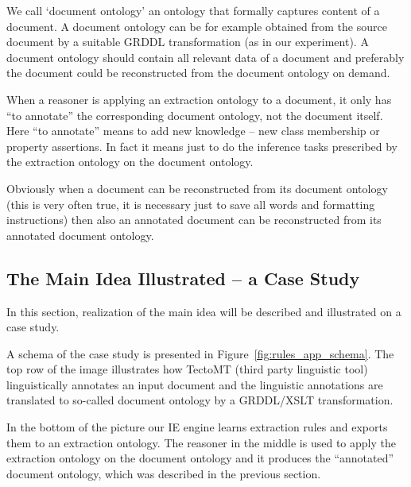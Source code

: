 We call `document ontology' an ontology that formally captures content of a document. A document ontology can be for example obtained from the source document by a suitable GRDDL transformation (as in our experiment). A document ontology should contain all relevant data of a document and preferably the document could be reconstructed from the document ontology on demand.

When a reasoner is applying an extraction ontology to a document, it only has ``to annotate'' the corresponding document ontology, not the document itself. Here ``to annotate'' means to add new knowledge -- new class membership or property assertions. In fact it means just to do the inference tasks prescribed by the extraction ontology on the document ontology. 

Obviously when a document can be reconstructed from its document ontology (this is very often true, it is necessary just to save all words and formatting instructions) then also an annotated document can be reconstructed from its annotated document ontology. 





\subsection{The Main Idea Illustrated -- a Case Study} \label{sec:onto_case}

In this section, realization of the main idea will be described and illustrated on a case study.

A schema of the case study is presented in Figure~\ref{fig:rules_app_schema}.  
The top row of the image illustrates how TectoMT (third party linguistic tool) linguistically annotates an input document and the linguistic annotations are translated to so-called document ontology by a GRDDL/XSLT transformation.

In the bottom of the picture our IE engine learns extraction rules and exports them to an extraction ontology. The reasoner in the middle is used to apply the extraction ontology on the document ontology and it produces the ``annotated'' document ontology, which was described in the previous section.


